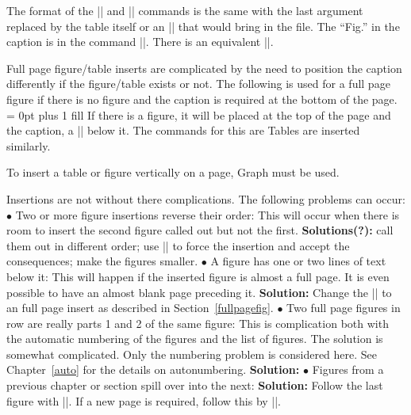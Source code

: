 The format of the |\tableform| and |\tableinsert| commands
 is the same with the last argument
replaced by the table itself or an || that would bring
in the file. The ``Fig.'' in the caption is in the command |\figurelabel|.
There is an equivalent |\tablelabel|. 

Full page figure/table inserts are complicated by the need to position the
caption differently if the figure/table exists or not. The following is used
for a full page figure if there is no figure and the caption is required at
the bottom of the page. 
\begintt
\beginpageinsert
\captionskip = 0pt plus 1 fill %
\endpageinsert
\endtt
If there is a figure, it will be placed at the top of the page and
the caption, a |\captionskip| below it. The commands for this are 
\begintt
\beginpageinsert
{} 
\endpageinsert
\endtt
Tables are inserted similarly. 

To insert a table or figure vertically on a page, \tex Graph must be used. 

Insertions are not without there complications. The following problems can
occur:
\beginlist
\li $\bullet$ Two or more figure insertions reverse their order: This will
occur when there is room to insert the second figure called out but not the
first. {\bf Solutions(?):} call them out in different order; use
|\figureform| to force the insertion and accept the consequences; make the
figures smaller. 
\li $\bullet$ A figure has one or two lines of text below it: This will
happen if the inserted figure is almost a full page. It is even possible to
have an almost blank page preceding it. {\bf Solution:} Change the
|\figureinsert| to an full page insert as described in
Section~\ref{fullpagefig}. 
\li $\bullet$ Two full page figures in row are really parts 1 and 2 of the
same figure: This is complication both with the automatic numbering of the
figures and the list of figures. The solution is somewhat complicated. 
Only the numbering problem is considered here. See Chapter~\ref{auto}
for the details on autonumbering. {\bf Solution:} 
\begintt
{}
\begingroup
\autonumberingoff
\beginpageinsert
{}
\endpageinsert
\beginpageinsert
{}
\endpageinsert
\endgroup
\endtt
\li $\bullet$ Figures from a previous chapter or section spill over into the
next: {\bf Solution:} Follow the last figure with |\ejectinserts|. If a new
page is required, follow this by |\ejectpage|. 

